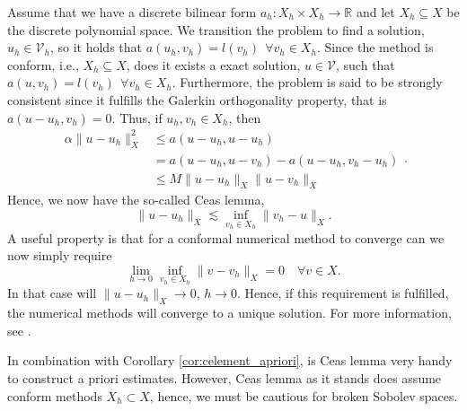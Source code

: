 Assume that we have a discrete bilinear form $a_{h}: X_{h}\times X_{h} \to \mathbb{R} $ and let $X _{h} \subseteq  X $ be the discrete polynomial space. We transition the problem to find a solution, $u_{h} \in  \mathcal{V}_{h}$, so it holds that $a\left( u_{h},v_{h} \right)  = l\left( v_{h} \right) \ \  \forall v_{h} \in X _{h} $.
Since the method is conform, i.e., $X _{h} \subseteq  X $, does it exists a exact solution, $u \in  \mathcal{V}$, such that \(
a \left( u, v_{h} \right)  = l\left( v_{h} \right)  \ \  \forall v_{h} \in  X _{h}.
\)
Furthermore, the problem is said to be strongly consistent since it fulfills the Galerkin orthogonality property, that is $ a\left( u -u_{h} , v_{h} \right)  =0$. Thus, if $u_{h},v_{h} \in  X _{h}$, then
\begin{equation}
\label{eq:cealemma_proof}
    \begin{split}
\alpha \| u -u_{h} \|_{ X  }^{ 2 } & \le  a\left( u - u_{h}, u - u_{h}  \right)    \\
&= a\left( u - u_{h}, u -v_{h} \right) - a\left( u -u_{h}, v_{h} - u_{h} \right)  \\
 &  \le  M \| u - u_{h} \|_{ X  }^{  }  \| u - v_{h} \|_{ X  }^{  }
    \end{split}
.\end{equation}
Hence, we now have the so-called Ceas lemma, \[
\| u - u_{h} \|_{ X  }^{  }  \lesssim  \inf_{v_{h} \in X_{h} } \|  v_{h} - u \|_{X  }^{  }.
\]
A useful property is that for a conformal numerical method to converge can we now simply require \[
\lim_{h \to 0}  \inf_{v_{h} \in  X_{h}}  \| v - v_{h} \|_{ X  }^{  } = 0 \quad  \forall v \in X.
\]
In that case will $\| u - u_{h} \|_{ X  }^{  }  \to  0$, $h \to  0$. Hence, if this requirement is fulfilled, the numerical methods will converge to a unique solution.
For more information, see \cite[pp. 66]{quartdiff}.

In combination with Corollary \ref{cor:celement_apriori}, is Ceas lemma very handy to construct a priori estimates. However, Ceas lemma as it stands does assume conform methods $X_{h} \subset X$, hence, we must be cautious for broken Sobolev spaces.




